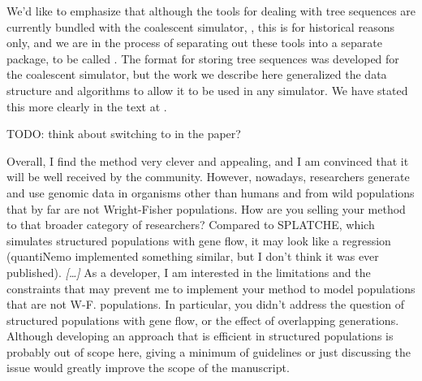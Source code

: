 We'd like to emphasize that although the tools for dealing with tree sequences
are currently bundled with the coalescent simulator, \msprime{},
this is for historical reasons only, 
and we are in the process of separating out these tools into a separate package,
to be called \tskit.
The format for storing tree sequences was developed for the coalescent simulator,
but the work we describe here generalized the data structure and algorithms
to allow it to be used in any simulator.
We have stated this more clearly in the text at .

TODO: think about switching to \tskit{} in the paper?


\begin{point}{}
    Overall, I find the method very clever and appealing, and I am convinced that
    it will be well received by the community. However, nowadays, researchers
    generate and use genomic data in organisms other than humans and from wild
    populations that by far are not Wright-Fisher populations. How are you selling
    your method to that broader category of researchers? Compared to SPLATCHE,
    which simulates structured populations with gene flow, it may look like a
    regression (quantiNemo implemented something similar, but I don't think it was
    ever published).
    \emph{[\ldots]}
    As a developer, I am interested in the limitations and the constraints that may
    prevent me to implement your method to model populations that are not W-F.
    populations. In particular, you didn't address the question of structured
    populations with gene flow, or the effect of overlapping generations. Although
    developing an approach that is efficient in structured populations is probably
    out of scope here, giving a minimum of guidelines or just discussing the issue
    would greatly improve the scope of the manuscript.
\end{point}



